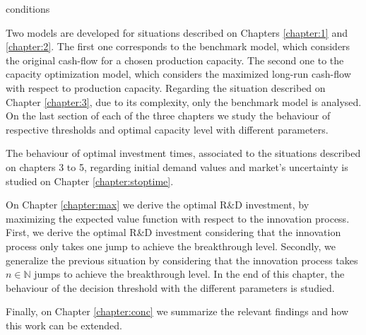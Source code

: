 conditions

Two models are developed for situations described on Chapters \ref{chapter:1} and \ref{chapter:2}. The first one corresponds to the benchmark model, which considers the original cash-flow for a chosen production capacity. The second one to the capacity optimization model, which considers the maximized long-run cash-flow with respect to production capacity. 
Regarding the situation described on Chapter \ref{chapter:3}, due to its complexity, only the benchmark model is analysed.
On the last section of each of the three chapters we study the behaviour of respective thresholds and optimal capacity level with different parameters.


The behaviour of optimal investment times, associated to the situations described on chapters 3 to 5, regarding initial demand values and market's uncertainty is studied on Chapter \ref{chapter:stoptime}.



On Chapter \ref{chapter:max} we derive the optimal R\&D investment, by maximizing the expected value function with respect to the innovation process. 
First, we derive the optimal R\&D investment considering that the innovation process only takes one jump to achieve the breakthrough level.
Secondly, we generalize the previous situation by considering that the innovation process takes $n \in \mathds{N}$ jumps to achieve the breakthrough level.
In the end of this chapter, the behaviour of the decision threshold with the different parameters is studied.



Finally, on Chapter \ref{chapter:conc} we summarize the relevant findings and how this work can be extended.


